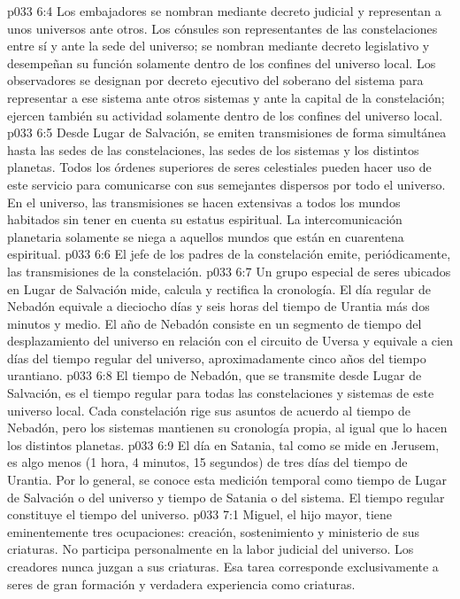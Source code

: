 \vs p033 6:4 \pc Los embajadores se nombran mediante decreto judicial y representan a unos universos ante otros. Los cónsules son representantes de las constelaciones entre sí y ante la sede del universo; se nombran mediante decreto legislativo y desempeñan su función solamente dentro de los confines del universo local. Los observadores se designan por decreto ejecutivo del soberano del sistema para representar a ese sistema ante otros sistemas y ante la capital de la constelación; ejercen también su actividad solamente dentro de los confines del universo local.
\vs p033 6:5 \pc Desde Lugar de Salvación, se emiten transmisiones de forma simultánea hasta las sedes de las constelaciones, las sedes de los sistemas y los distintos planetas. Todos los órdenes superiores de seres celestiales pueden hacer uso de este servicio para comunicarse con sus semejantes dispersos por todo el universo. En el universo, las transmisiones se hacen extensivas a todos los mundos habitados sin tener en cuenta su estatus espiritual. La intercomunicación planetaria solamente se niega a aquellos mundos que están en cuarentena espiritual.
\vs p033 6:6 El jefe de los padres de la constelación emite, periódicamente, las transmisiones de la constelación.
\vs p033 6:7 \pc Un grupo especial de seres ubicados en Lugar de Salvación mide, calcula y rectifica la cronología. El día regular de Nebadón equivale a dieciocho días y seis horas del tiempo de Urantia más dos minutos y medio. El año de Nebadón consiste en un segmento de tiempo del desplazamiento del universo en relación con el circuito de Uversa y equivale a cien días del tiempo regular del universo, aproximadamente cinco años del tiempo urantiano.
\vs p033 6:8 El tiempo de Nebadón, que se transmite desde Lugar de Salvación, es el tiempo regular para todas las constelaciones y sistemas de este universo local. Cada constelación rige sus asuntos de acuerdo al tiempo de Nebadón, pero los sistemas mantienen su cronología propia, al igual que lo hacen los distintos planetas.
\vs p033 6:9 El día en Satania, tal como se mide en Jerusem, es algo menos (1 hora, 4 minutos, 15 segundos) de tres días del tiempo de Urantia. Por lo general, se conoce esta medición temporal como tiempo de Lugar de Salvación o del universo y tiempo de Satania o del sistema. El tiempo regular constituye el tiempo del universo.
\vs p033 7:1 Miguel, el hijo mayor, tiene eminentemente tres ocupaciones: creación, sostenimiento y ministerio de sus criaturas. No participa personalmente en la labor judicial del universo. Los creadores nunca juzgan a sus criaturas. Esa tarea corresponde exclusivamente a seres de gran formación y verdadera experiencia como criaturas.
